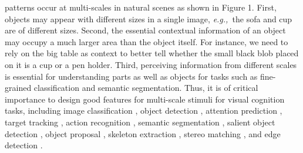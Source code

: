 \documentclass[10pt,journal,cspaper,compsoc]{IEEEtran}
\newcommand{\figref}[1]{Figure 1}%
\newcommand{\figref}[1]{Fig.~\ref{#1}}%
\def\eg{\emph{e.g.,~}}
\begin{document}
\maketitle
\IEEEdisplaynontitleabstractindextext
\IEEEpeerreviewmaketitle

 patterns occur at multi-scales in natural scenes
as shown in \figref{fig:receptive_field}.
%
First, objects may appear with different sizes in a single image,
\eg the sofa and cup are of different sizes.
%
Second, the essential contextual information of an object may occupy a much
larger area than the object itself.
%
For instance, we need to rely on the big table as context to better tell
whether the small black blob placed on it is a cup or a pen holder.
%
Third, perceiving information from different scales is essential for
understanding parts as well as objects for tasks 
such as fine-grained classification and semantic segmentation.
%
Thus, it is of critical importance to design good features for 
multi-scale stimuli for visual cognition tasks,
including image classification \cite{krizhevsky2012imagenet},
object detection \cite{ren2015faster},
attention prediction \cite{selvaraju2017grad},
target tracking \cite{zhang2017multi},
action recognition \cite{simonyan2014two},
semantic segmentation \cite{chen2018deeplab},
salient object detection \cite{hou2017deeply,BorjiCVM2019},
object proposal \cite{ren2015faster,BingObjCheng2018},
skeleton extraction \cite{zhao2018hifi}, 
stereo matching \cite{nie2019multi},
and edge detection \cite{xie2015holistically,liu2017richer}.
\end{document}
